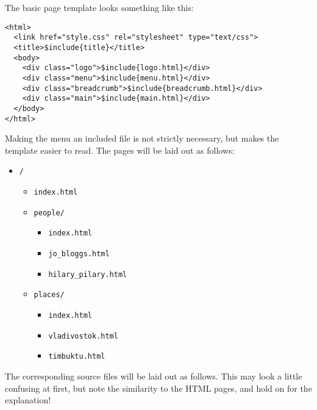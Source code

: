 \documentclass[english]{scrartcl}
\begin{document}
The basic page template looks something like this:

\begin{verbatim}
<html>
  <link href="style.css" rel="stylesheet" type="text/css">
  <title>$include{title}</title>
  <body>
    <div class="logo">$include{logo.html}</div>
    <div class="menu">$include{menu.html}</div>
    <div class="breadcrumb">$include{breadcrumb.html}</div>
    <div class="main">$include{main.html}</div>
  </body>
</html>
\end{verbatim}

Making the menu an included file is not strictly necessary, but makes the template easier to read. The pages will be laid out as follows:

\begin{itemize}
\item \verb|/|
  \begin{itemize}
  \item \verb|index.html|
  \item \verb|people/|
    \begin{itemize}
    \item \verb|index.html|
    \item \verb|jo_bloggs.html|
    \item \verb|hilary_pilary.html|
    \end{itemize}
  \item \verb|places/|
    \begin{itemize}
    \item \verb|index.html|
    \item \verb|vladivostok.html|
    \item \verb|timbuktu.html|
    \end{itemize}
  \end{itemize}
\end{itemize}

The corresponding source files will be laid out as follows. This may look a little confusing at first, but note the similarity to the HTML pages, and hold on for the explanation!
\end{document}
